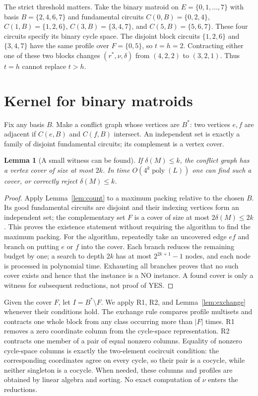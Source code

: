 \documentclass[11pt]{article}
\newtheorem{lemma}[theorem]{Lemma}
\newcommand{\poly}{\operatorname{poly}}
\begin{document}
The strict threshold matters.  Take the binary matroid on
$E=\{0,1,\ldots,7\}$ with basis $B=\{2,4,6,7\}$ and fundamental
circuits $C(0,B)=\{0,2,4\}$, $C(1,B)=\{1,2,6\}$,
$C(3,B)=\{3,4,7\}$, and $C(5,B)=\{5,6,7\}$.  These four circuits
specify its binary cycle space.  The disjoint block circuits
$\{1,2,6\}$ and $\{3,4,7\}$ have the same profile over
$F=\{0,5\}$, so $t=h=2$.  Contracting either one of these two blocks
changes $(r^*,\nu,\delta)$ from $(4,2,2)$ to $(3,2,1)$.
Thus $t=h$ cannot replace $t>h$.

\section{Kernel for binary matroids}\label{sec:kernel}
Fix any basis $B$.  Make a conflict graph whose vertices are $B^*$:
two vertices $e,f$ are adjacent if $C(e,B)$ and $C(f,B)$ intersect.
An independent set is exactly a family of disjoint fundamental
circuits; its complement is a vertex cover.

\begin{lemma}[A small witness can be found]\label{lem:cover}
If $\delta(M)\leq k$, the conflict graph has a vertex cover of size
at most $2k$.  In time $O(4^k\poly(L))$ one can find such a
cover, or correctly reject $\delta(M)\leq k$.
\end{lemma}
\begin{proof}
Apply Lemma~\ref{lem:count} to a maximum packing relative to the
chosen $B$.  Its good fundamental circuits are disjoint and their
indexing vertices form an independent set; the complementary set
$F$ is a cover of size at most $2\delta(M)\leq2k$.  This proves the
existence statement without requiring the algorithm to find the
maximum packing.  For the algorithm, repeatedly take an uncovered
edge $ef$ and branch on putting $e$ or $f$ into the cover.  Each
branch reduces the remaining budget by one; a search to depth $2k$
has at most $2^{2k+1}-1$ nodes, and each node is processed in
polynomial time.  Exhausting all branches proves that no such cover
exists and hence that the instance is a NO instance.  A found cover
is only a witness for subsequent reductions, not proof of YES.
\end{proof}

Given the cover $F$, let $I=B^*\setminus F$.  We apply R1, R2, and
Lemma~\ref{lem:exchange} whenever their conditions hold.  The
exchange rule compares profile multisets and contracts one whole
block from any class occurring more than $|F|$ times.  R1 removes a
zero coordinate column from the cycle-space representation.  R2
contracts one member of a pair of equal nonzero columns.  Equality of
nonzero cycle-space columns is exactly the two-element cocircuit
condition: the corresponding coordinates agree on every cycle,
so their pair is a cocycle, while neither singleton is a cocycle.
When needed, these columns and profiles are obtained by linear algebra
and sorting.  No exact computation of $\nu$ enters the reductions.
\end{document}
